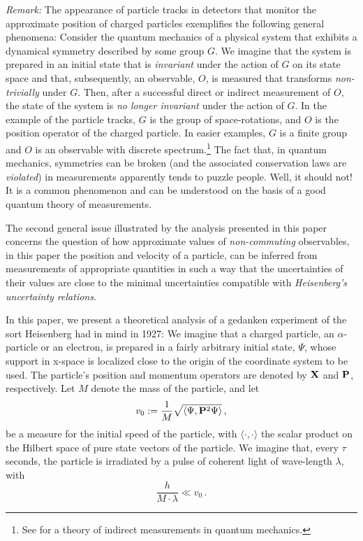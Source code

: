 \documentclass[12pt]{article}
\begin{document}
\textit{Remark:} The appearance of particle tracks in detectors that monitor the approximate position of charged particles
exemplifies the following general phenomena: Consider the quantum mechanics of a physical system that exhibits a
 dynamical symmetry described by some group $G$. We imagine that the system is prepared in an initial state that is
 \textit{invariant} under the action of $G$ on its state space and that, subsequently, an observable, $O$, is measured that
transforms \textit{non-trivially} under $G$. Then, after a successful direct or indirect measurement of $O$, the state of the
system is \textit{no longer invariant} under the action of $G$. In the example of the particle tracks, $G$ is the group of
space-rotations, and $O$ is the position operator of the charged particle. In easier examples, $G$ is a finite group and
$O$ is an observable with discrete spectrum.\footnote{See \cite{MK, BB, BBB, BFFS} for a theory of indirect measurements in quantum mechanics.} The fact that, in quantum mechanics, symmetries can be broken 
(and the associated conservation laws are \textit{violated}) in measurements apparently tends to
puzzle people. Well, it should not! It is a common phenomenon and can be understood on the basis of a 
good quantum theory of measurements. 

The second general issue illustrated by the analysis presented in this paper concerns
 the question of how approximate values of \textit{non-commuting} observables, in this paper the position and velocity 
 of a particle, can be inferred from measurements of appropriate quantities in such a way that the uncertainties of their 
 values are close to the minimal uncertainties compatible with \textit{Heisenberg's uncertainty relations}. 
 
In this paper, we present a theoretical analysis of a gedanken experiment of the sort Heisenberg  had in mind in 1927: 
We imagine that a charged particle, an $\alpha$-particle or an electron, is prepared in a fairly arbitrary initial state, $\Psi$, 
whose support in x-space is localized close to the origin of the coordinate system to be used. The particle's position and 
momentum operators are denoted by ${\bf{X}}$ and ${\bf{P}}$, respectively. Let $M$ denote the mass of the particle, 
and let 
\begin{equation}\label{initial state}
v_0:= \frac{1}{M} \sqrt{\langle \Psi, {\bf{P}}^{2} \Psi \rangle}\,,
\end{equation}
be a measure for the initial speed of the particle, with $\langle \cdot ,\cdot \rangle$ the scalar product on the Hilbert space of pure state vectors of the particle. We imagine that, 
every $\tau$ seconds, the particle is irradiated by a pulse of coherent light of wave-length $\lambda$, with 
\begin{equation}\label{speed}
\frac{h}{M\cdot \lambda} \ll v_0\,.
\end{equation}
\end{document}
